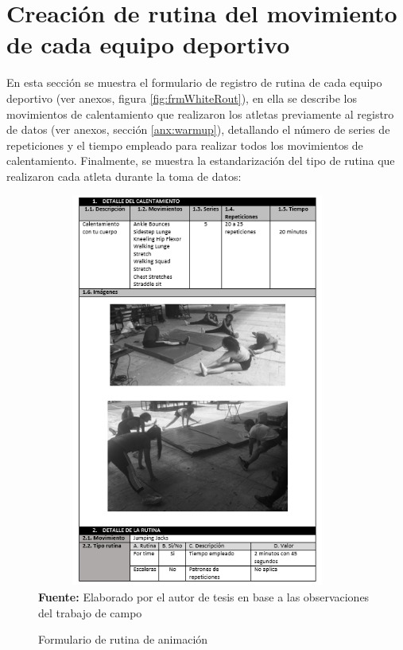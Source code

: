 \section{Creaci\'on de rutina del movimiento de cada equipo deportivo} \label{res:idMov}
En esta secci\'on se muestra el formulario de registro de rutina de cada equipo deportivo (ver anexos, figura \ref{fig:frmWhiteRout}), en ella se describe los movimientos de calentamiento que realizaron los atletas previamente al registro de datos (ver anexos, secci\'on \ref{anx:warmup}), detallando el n\'umero de series de repeticiones y el tiempo empleado para realizar todos los movimientos de calentamiento. Finalmente, se muestra la estandarizaci\'on del tipo de rutina que  realizaron cada atleta durante la toma de datos:
\begin{figure}[H]
	\caption{Formulario de rutina de animaci\'on}
	\label{fig:frmRoutCher}
	\centering
	\includegraphics[width=400px,height=490px]{graphics/resultados/rutina-cheerleaders.PNG} \\
	\textbf{Fuente:} Elaborado por el autor de tesis en base a las observaciones del trabajo de campo
\end{figure}
